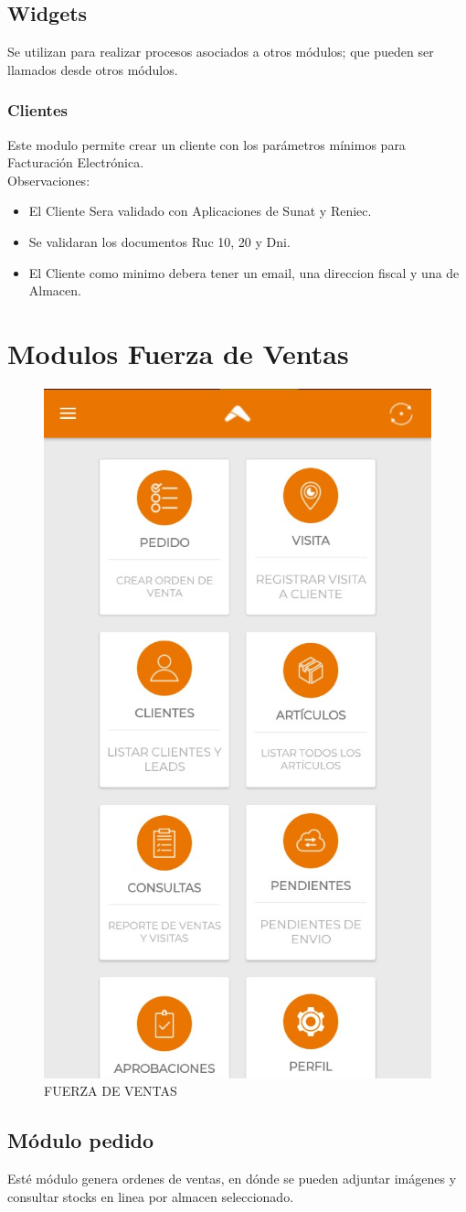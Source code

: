 \documentclass[pdftex,12pt,oneside,a4paper,spanish, english, brazil]{abntex2}
\begin{document}
\begin{sloppypar}
          \section{Widgets}
          Se utilizan para realizar procesos asociados a otros módulos; que pueden ser llamados desde otros módulos.
          \subsection{Clientes}
          Este modulo permite crear un cliente con los parámetros mínimos para Facturación Electrónica.\\
          Observaciones:
          \begin{itemize}
          	\item El Cliente Sera validado con Aplicaciones de Sunat y Reniec.
          	\item Se validaran los documentos Ruc 10, 20 y Dni.
          	\item El Cliente como minimo debera tener un email, una direccion fiscal y una de Almacen.
          \end{itemize}
            \chapter{Modulos Fuerza de Ventas}
            \begin{figure}[h!]
            	\centering
            	\caption{FUERZA DE VENTAS} \label{fig:maia}
            	\includegraphics[width=0.2\linewidth,frame=0.5pt 5pt]{img/FV}
            \end{figure}
              \section{Módulo pedido}
              Esté módulo genera ordenes de ventas, en dónde se pueden adjuntar imágenes y consultar stocks en linea por almacen seleccionado.
              \begin{itemize}
              	

\end{itemize}
\end{sloppypar}
\end{document}
